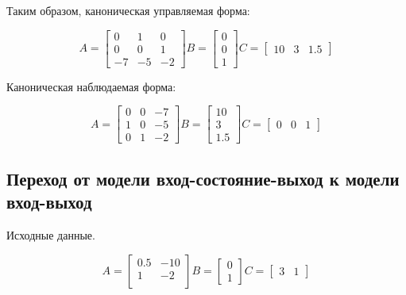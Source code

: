 \documentclass[12pt, a4paper] {ncc}
\begin{document}
		Таким образом, каноническая управляемая форма:\\
		\begin{center}
    		\[A = 
    			\begin{bmatrix}
    				0 & 1 & 0 \\
    				0 & 0 & 1 \\
    			   -7 & -5 & -2
    			\end{bmatrix}
    		  B = 
				\begin{bmatrix}
					0 \\ 0 \\ 1
				\end{bmatrix}
    		  C = 
				\begin{bmatrix}
					10 & 3 & 1.5
				\end{bmatrix}
			\]
		\end{center}

		Каноническая наблюдаемая форма:\\
		\begin{center}
    		\[A = 
    			\begin{bmatrix}
    				0 & 0 & -7 \\
    				1 & 0 & -5 \\
    			    0 & 1 & -2
    			\end{bmatrix}
    		  B = 
				\begin{bmatrix}
					10 \\ 3 \\ 1.5
				\end{bmatrix}
    		  C = 
				\begin{bmatrix}
					0 & 0 & 1
				\end{bmatrix}
			\]
		\end{center}

	\subsection{Переход от модели вход-состояние-выход к модели вход-выход}

		Исходные данные.
		\begin{center}
    		\[A = 
    			\begin{bmatrix}
    				0.5 & -10 \\
    				1   & -2  \\
    			\end{bmatrix}
    		  B = 
				\begin{bmatrix}
					0 \\ 1 
				\end{bmatrix}
    		  C = 
				\begin{bmatrix}
					3 & 1
				\end{bmatrix}
			\]
		\end{center}
\end{document}
